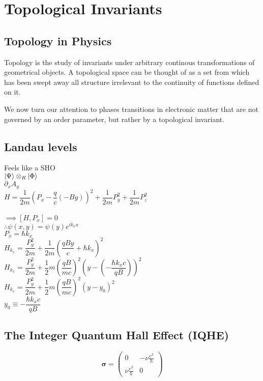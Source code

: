 \section{\label{sec:top-phases}Topological Invariants}

\subsection{\label{ssec:topo-intro}Topology in Physics}

Topology is the study of invariants under arbitrary continous transformations of geometrical objects. 
A topological space can be thought of as a set from which has been swept away all structure irrelevant to the continuity of functions defined on it.

We now turn our attention to phases transitions in electronic matter that are not governed by an order parameter, but rather by a topological invariant.

\subsection{\label{ssec:landau-levels}Landau levels}
Feels like a SHO \\ 
$\ket{\Psi} \mathbin{\mathop{\otimes}\displaylimits_{R}} \ket{\Phi}$ \\
$\partial_{x}A_{y}$ \\
$H = \dfrac{1}{2m}\left(P_{x} - \dfrac{q}{c}\left(-By\right)\right)^{2} + \dfrac{1}{2m}P_{y}^{2} + \dfrac{1}{2m}P_{z}^{2}$ \\ \\
$ \implies \left[H,P_{x}\right] = 0$ \\
$\therefore \psi(x,y) = \psi(y) e^{ik_{x}x}$ \\
$P_{x} = \hbar k_{x}$ \\
$H_{k_{x}} = \dfrac{P_{y}^{2}}{2m} + \dfrac{1}{2m}\left(\dfrac{qBy}{c} + \hbar k_{x}\right)^{2}  $ \\
$H_{k_{x}} = \dfrac{P_{y}^{2}}{2m} + \dfrac{1}{2} m \left(\dfrac{qB}{mc}\right)^{2} \left(y - \left(- \dfrac{\hbar k_{x} c}{qB}\right)\right)^{2} $ \\
$H_{k_{x}} = \dfrac{P_{y}^{2}}{2m} + \dfrac{1}{2} m \left(\dfrac{qB}{mc}\right)^{2} \left(y - y_{0}\right)^{2} $ \\
$y_{0} \equiv - \dfrac{\hbar k_{x} c}{qB}$

\subsection{\label{ssec:iqhe}The Integer Quantum Hall Effect (IQHE)}
$$
\boldsymbol{\sigma}=\left(\begin{array}{cc}
    0 & -\nu \frac{e^{2}}{h} \\
    \nu \frac{e^{2}}{h} & 0
    \end{array}\right)
$$


